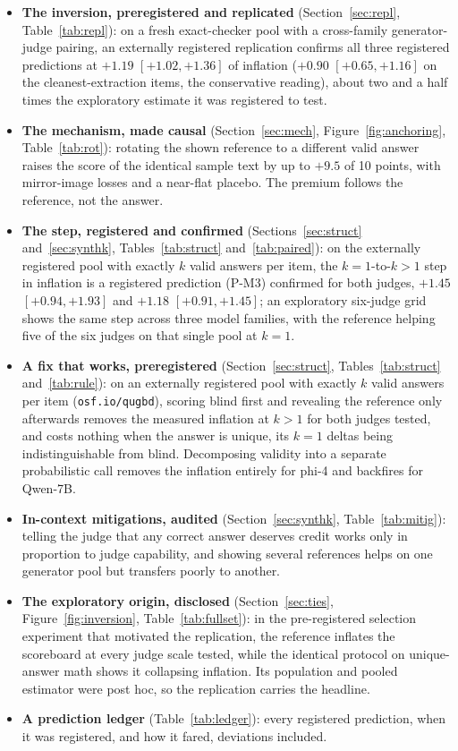 \documentclass[11pt]{article}
\begin{document}
\begin{itemize}
\item \textbf{The inversion, preregistered and replicated} (Section~\ref{sec:repl}, Table~\ref{tab:repl}): on a fresh exact-checker pool with a cross-family generator-judge pairing, an externally registered replication confirms all three registered predictions at $+1.19$ $[+1.02, +1.36]$ of inflation ($+0.90$ $[+0.65, +1.16]$ on the cleanest-extraction items, the conservative reading), about two and a half times the exploratory estimate it was registered to test.
\item \textbf{The mechanism, made causal} (Section~\ref{sec:mech}, Figure~\ref{fig:anchoring}, Table~\ref{tab:rot}): rotating the shown reference to a different valid answer raises the score of the identical sample text by up to $+9.5$ of 10 points, with mirror-image losses and a near-flat placebo.
The premium follows the reference, not the answer.
\item \textbf{The step, registered and confirmed} (Sections~\ref{sec:struct} and~\ref{sec:synthk}, Tables~\ref{tab:struct} and~\ref{tab:paired}): on the externally registered pool with exactly $k$ valid answers per item, the $k{=}1$-to-$k{>}1$ step in inflation is a registered prediction (P-M3) confirmed for both judges, $+1.45$ $[+0.94, +1.93]$ and $+1.18$ $[+0.91, +1.45]$; an exploratory six-judge grid shows the same step across three model families, with the reference helping five of the six judges on that single pool at $k{=}1$.
\item \textbf{A fix that works, preregistered} (Section~\ref{sec:struct}, Tables~\ref{tab:struct} and~\ref{tab:rule}): on an externally registered pool with exactly $k$ valid answers per item (\texttt{osf.io/qugbd}), scoring blind first and revealing the reference only afterwards removes the measured inflation at $k{>}1$ for both judges tested, and costs nothing when the answer is unique, its $k{=}1$ deltas being indistinguishable from blind.
Decomposing validity into a separate probabilistic call removes the inflation entirely for phi-4 and backfires for Qwen-7B.
\item \textbf{In-context mitigations, audited} (Section~\ref{sec:synthk}, Table~\ref{tab:mitig}): telling the judge that any correct answer deserves credit works only in proportion to judge capability, and showing several references helps on one generator pool but transfers poorly to another.
\item \textbf{The exploratory origin, disclosed} (Section~\ref{sec:ties}, Figure~\ref{fig:inversion}, Table~\ref{tab:fullset}): in the pre-registered selection experiment that motivated the replication, the reference inflates the scoreboard at every judge scale tested, while the identical protocol on unique-answer math shows it collapsing inflation.
Its population and pooled estimator were post hoc, so the replication carries the headline.
\item \textbf{A prediction ledger} (Table~\ref{tab:ledger}): every registered prediction, when it was registered, and how it fared, deviations included.
\end{itemize}
\end{document}
